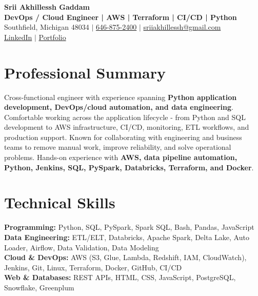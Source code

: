 \documentclass[letterpaper,10pt]{article}
\begin{document}
\fontsize{9.35pt}{10.45pt}\selectfont

\begin{center}
    {\LARGE \textbf{Srii Akhillessh Gaddam}} \\[-1pt]
    \textbf{DevOps / Cloud Engineer | AWS | Terraform | CI/CD | Python} \\[2pt]
    Southfield, Michigan 48034 $|$
    \href{tel:6468752400}{646-875-2400} $|$
    \href{mailto:sriiakhillessh@gmail.com}{sriiakhillessh@gmail.com} \\[1pt]
    \href{https://www.linkedin.com/in/srii-akhiilessh-gaddam-b48668191/}{LinkedIn} $|$
    \href{https://sriiakhillesshg.github.io/portfolio/}{Portfolio}
\end{center}
\vspace{-8pt}

\section{Professional Summary}
\small{Cross-functional engineer with experience spanning \textbf{Python application development, DevOps/cloud automation, and data engineering}. Comfortable working across the application lifecycle - from Python and SQL development to AWS infrastructure, CI/CD, monitoring, ETL workflows, and production support. Known for collaborating with engineering and business teams to remove manual work, improve reliability, and solve operational problems. Hands-on experience with \textbf{AWS, data pipeline automation, Python, Jenkins, SQL, PySpark, Databricks, Terraform, and Docker}.}

\section{Technical Skills}
\small{
\textbf{Programming:} Python, SQL, PySpark, Spark SQL, Bash, Pandas, JavaScript \\
\textbf{Data Engineering:} ETL/ELT, Databricks, Apache Spark, Delta Lake, Auto Loader, Airflow, Data Validation, Data Modeling \\
\textbf{Cloud \& DevOps:} AWS (S3, Glue, Lambda, Redshift, IAM, CloudWatch), Jenkins, Git, Linux, Terraform, Docker, GitHub, CI/CD \\
\textbf{Web \& Databases:} REST APIs, HTML, CSS, JavaScript, PostgreSQL, Snowflake, Greenplum
}
\end{document}
